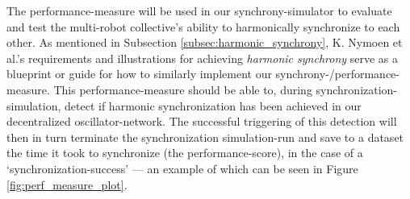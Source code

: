 The performance-measure will be used in our synchrony-simulator to evaluate and test the multi-robot collective's ability to harmonically synchronize to each other. As mentioned in Subsection \ref{subsec:harmonic_synchrony}, K. Nymoen et al.'s requirements and illustrations \cite{nymoen_synch} for achieving \textit{harmonic synchrony} serve as a blueprint or guide for how to similarly implement our synchrony-/performance-measure. This performance-measure should be able to, during synchronization-simulation, detect if harmonic synchronization has been achieved in our decentralized oscillator-network. The successful triggering of this detection will then in turn terminate the synchronization simulation-run and save to a dataset the time it took to synchronize (the performance-score), in the case of a `synchronization-success' — an example of which can be seen in Figure \ref{fig:perf_measure_plot}.

